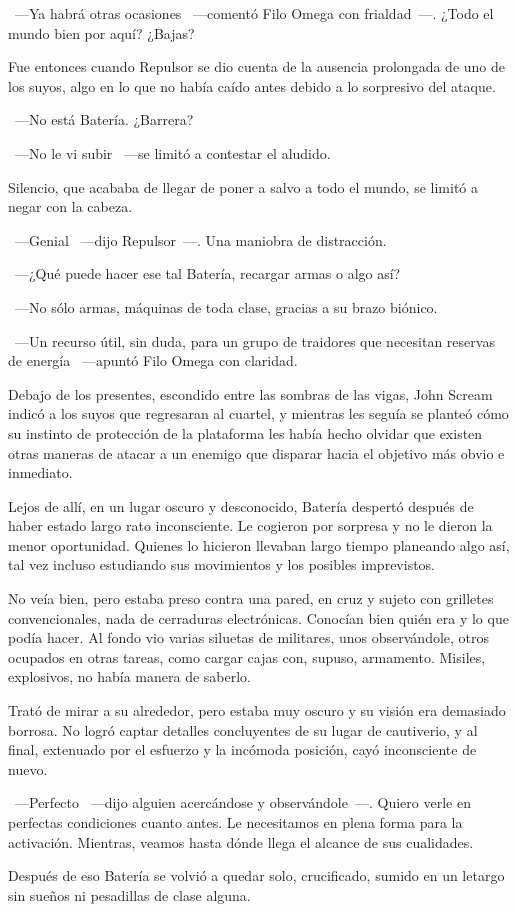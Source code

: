 ~---Ya habrá otras ocasiones ~---comentó Filo Omega con frialdad~---. ¿Todo el mundo bien por aquí? ¿Bajas?

Fue entonces cuando Repulsor se dio cuenta de la ausencia prolongada de uno de los suyos, algo en lo que no había caído antes debido a lo sorpresivo del ataque.

~---No está Batería. ¿Barrera?

~---No le vi subir ~---se limitó a contestar el aludido.

Silencio, que acababa de llegar de poner a salvo a todo el mundo, se limitó a negar con la cabeza.

~---Genial ~---dijo Repulsor~---. Una maniobra de distracción.

~---¿Qué puede hacer ese tal Batería, recargar armas o algo así?

~---No sólo armas, máquinas de toda clase, gracias a su brazo biónico.

~---Un recurso útil, sin duda, para un grupo de traidores que necesitan reservas de energía ~---apuntó Filo Omega con claridad.

Debajo de los presentes, escondido entre las sombras de las vigas, John Scream indicó a los suyos que regresaran al cuartel, y mientras les seguía se planteó cómo su instinto de protección de la plataforma les había hecho olvidar que existen otras maneras de atacar a un enemigo que disparar hacia el objetivo más obvio e inmediato.

\parbreak
Lejos de allí, en un lugar oscuro y desconocido, Batería despertó después de haber estado largo rato inconsciente. Le cogieron por sorpresa y no le dieron la menor oportunidad. Quienes lo hicieron llevaban largo tiempo planeando algo así, tal vez incluso estudiando sus movimientos y los posibles imprevistos.

No veía bien, pero estaba preso contra una pared, en cruz y sujeto con grilletes convencionales, nada de cerraduras electrónicas. Conocían bien quién era y lo que podía hacer. Al fondo vio varias siluetas de militares, unos observándole, otros ocupados en otras tareas, como cargar cajas con, supuso, armamento. Misiles, explosivos, no había manera de saberlo.

Trató de mirar a su alrededor, pero estaba muy oscuro y su visión era demasiado borrosa. No logró captar detalles concluyentes de su lugar de cautiverio, y al final, extenuado por el esfuerzo y la incómoda posición, cayó inconsciente de nuevo.

~---Perfecto ~---dijo alguien acercándose y observándole~---. Quiero verle en perfectas condiciones cuanto antes. Le necesitamos en plena forma para la activación. Mientras, veamos hasta dónde llega el alcance de sus cualidades.

Después de eso Batería se volvió a quedar solo, crucificado, sumido en un letargo sin sueños ni pesadillas de clase alguna.

\endinput
